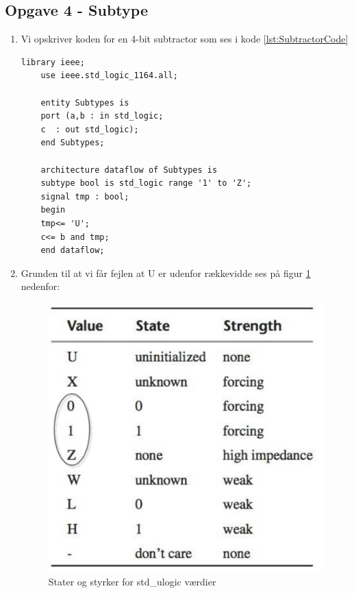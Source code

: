 \subsection{Opgave 4 - Subtype}
\begin{enumerate}
	\item[1)]
	Vi opskriver koden for en 4-bit subtractor som ses i kode \ref{lst:SubtractorCode}
	\begin{lstlisting}[caption={Subtractor kode},label={lst:SubtractorCode}]
	library ieee;
	use ieee.std_logic_1164.all;
	
	entity Subtypes is
	port (a,b : in std_logic;
	c  : out std_logic);
	end Subtypes;
	
	architecture dataflow of Subtypes is
	subtype bool is std_logic range '1' to 'Z';
	signal tmp : bool;
	begin 
	tmp<= 'U';
	c<= b and tmp;
	end dataflow;
		\end{lstlisting}
	\item[2)]
	
	Grunden til at vi får fejlen at U er udenfor rækkevidde ses på figur \ref{fig:stdulogicvalues} nedenfor:
	
		\begin{figure}[H]
			\centering
			\includegraphics[scale=0.23]{pictures/Oevelse3/Oevelse4_01Z.jpg}
			\caption{Stater og styrker for std\_ulogic værdier}
			\label{fig:stdulogicvalues}
		\end{figure}
	

\end{enumerate}

